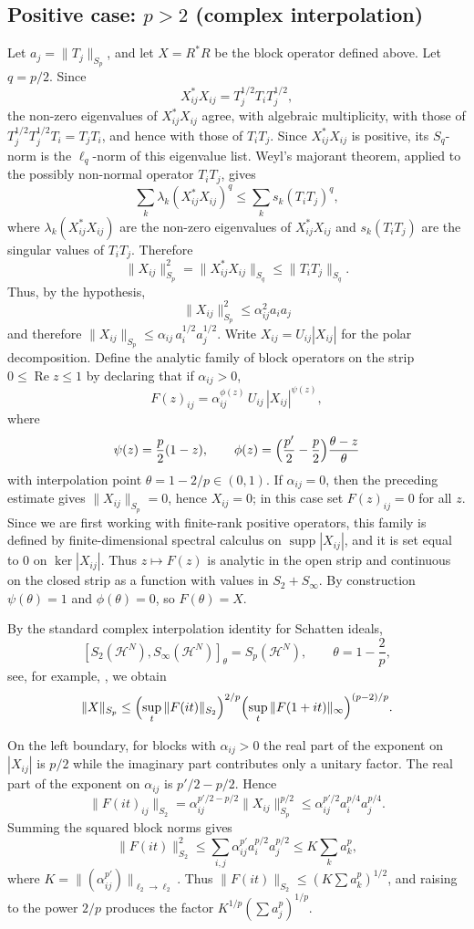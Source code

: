 \documentclass[10pt,a4paper]{amsart}
\newcommand{\1}{\mathbf{1}}
\begin{document}
\subsection{Positive case: $p>2$ (complex interpolation)}
\label{subsec:positive-pgtwo}

Let $a_j=\|T_j\|_{S_p}$, and let $X=R^*R$ be the block operator defined above.
Let $q=p/2$. Since
\[
X_{ij}^*X_{ij}=T_j^{1/2}T_iT_j^{1/2},
\]
the non-zero eigenvalues of $X_{ij}^*X_{ij}$ agree, with algebraic
multiplicity, with those of $T_j^{1/2}T_j^{1/2}T_i=T_jT_i$, and hence with
those of $T_iT_j$. Since $X_{ij}^*X_{ij}$ is positive, its $S_q$-norm is the
$\ell_q$-norm of this eigenvalue list. Weyl's majorant theorem, applied to the
possibly non-normal operator $T_iT_j$, gives
\[
\sum_k \lambda_k(X_{ij}^*X_{ij})^q
\le
\sum_k s_k(T_iT_j)^q,
\]
where $\lambda_k(X_{ij}^*X_{ij})$ are the non-zero eigenvalues of
$X_{ij}^*X_{ij}$ and $s_k(T_iT_j)$ are the singular values of $T_iT_j$.
Therefore
\[
\|X_{ij}\|_{S_p}^2
=
\|X_{ij}^*X_{ij}\|_{S_q}
\le
\|T_iT_j\|_{S_q}.
\]
Thus, by the hypothesis,
\[
\|X_{ij}\|_{S_p}^2\leq \alpha_{ij}^2 a_i a_j
\]
and therefore $\|X_{ij}\|_{S_p}\leq\alpha_{ij}\,a_i^{1/2}a_j^{1/2}$. Write $X_{ij}=U_{ij}|X_{ij}|$ for the polar decomposition. Define the analytic family of block operators on the strip $0\leq\operatorname{Re}z\leq 1$ by declaring that if $\alpha_{ij}>0$,
\[
F(z)_{ij}=\alpha_{ij}^{\phi(z)}\,U_{ij}\,|X_{ij}|^{\psi(z)},
\]
where
\[
\psi(z)=\frac{p}{2}(1-z),\qquad\phi(z)=\Bigl(\frac{p'}{2}-\frac{p}{2}\Bigr)\frac{\theta-z}{\theta}
\]
with interpolation point $\theta=1-2/p\in(0,1)$. If \(\alpha_{ij}=0\), then the preceding estimate gives
\(\|X_{ij}\|_{S_p}=0\), hence \(X_{ij}=0\); in this case set
\(F(z)_{ij}=0\) for all \(z\). Since we are first working with finite-rank positive operators, this family is
defined by finite-dimensional spectral calculus on $\operatorname{supp}|X_{ij}|$,
and it is set equal to $0$ on $\ker |X_{ij}|$. Thus $z\mapsto F(z)$ is analytic
in the open strip and continuous on the closed strip as a function with values in
$S_2+S_\infty$. By construction $\psi(\theta)=1$ and $\phi(\theta)=0$, so $F(\theta)=X$.

By the standard complex interpolation identity for Schatten ideals,
\[
[S_2(\mathcal H^N),S_\infty(\mathcal H^N)]_\theta
=
S_p(\mathcal H^N),
\qquad \theta=1-\frac2p,
\]
see, for example, \cite{SimonTraceIdeals}, we obtain
\[
\|X\|_{S_p}\leq\Bigl(\sup_t\|F(it)\|_{S_2}\Bigr)^{2/p}\Bigl(\sup_t\|F(1+it)\|_\infty\Bigr)^{(p-2)/p}.
\]

On the left boundary, for blocks with $\alpha_{ij}>0$ the real part of the exponent on $|X_{ij}|$ is $p/2$ while the imaginary part contributes only a unitary factor. The real part of the exponent on $\alpha_{ij}$ is $p'/2-p/2$. Hence
\[
\|F(it)_{ij}\|_{S_2}=\alpha_{ij}^{p'/2-p/2}\|X_{ij}\|_{S_p}^{p/2}\leq\alpha_{ij}^{p'/2}a_i^{p/4}a_j^{p/4}.
\]
Summing the squared block norms gives
\[
\|F(it)\|_{S_2}^2\leq\sum_{i,j}\alpha_{ij}^{p'}a_i^{p/2}a_j^{p/2}\leq K\sum_k a_k^p,
\]
where $K=\|(\alpha_{ij}^{p'})\|_{\ell_2\to\ell_2}$. Thus $\|F(it)\|_{S_2}\leq(K\sum a_k^p)^{1/2}$, and raising to the power $2/p$ produces the factor $K^{1/p}(\sum a_j^p)^{1/p}$.
\end{document}
